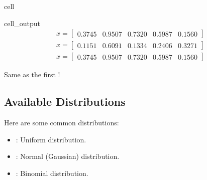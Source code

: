 \documentclass[letterpaper,10pt,english]{jupyterBook}
\begin{document}
\begin{sphinxuseclass}{cell}
\begin{sphinxVerbatimOutput}
\begin{sphinxuseclass}{cell_output}\begin{equation*}
\begin{split}\displaystyle x=\left[
\begin{array}{}
  0.3745 &  0.9507 &  0.7320 &  0.5987 &  0.1560
\end{array}
\right]\end{split}
\end{equation*}\begin{equation*}
\begin{split}\displaystyle x=\left[
\begin{array}{}
  0.1151 &  0.6091 &  0.1334 &  0.2406 &  0.3271
\end{array}
\right]\end{split}
\end{equation*}\begin{equation*}
\begin{split}\displaystyle x=\left[
\begin{array}{}
  0.3745 &  0.9507 &  0.7320 &  0.5987 &  0.1560
\end{array}
\right]\end{split}
\end{equation*}
\begin{sphinxVerbatim}[commandchars=\\\{\}]
\PYGZsh{} Same as the first !
\end{sphinxVerbatim}

\end{sphinxuseclass}\end{sphinxVerbatimOutput}

\end{sphinxuseclass}

\subsection{Available Distributions}
\label{\detokenize{01:available-distributions}}
\sphinxAtStartPar
Here are some common distributions:
\begin{itemize}
\item {} 
\sphinxAtStartPar
{} : Uniform distribution.

\item {} 
\sphinxAtStartPar
{} : Normal (Gaussian) distribution.

\item {} 
\sphinxAtStartPar
{} : Binomial distribution.

\end{itemize}
\end{document}
